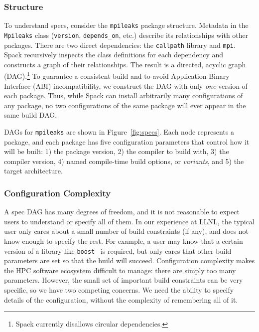 \subsubsection{Structure}
To understand specs, consider the {\tt mpileaks} package structure.
Metadata in the {\tt Mpileaks} class ({\tt version}, {\tt depends\_on}, etc.) describe
its relationships with other packages.  There are two direct dependencies:
the {\tt callpath} library and {\tt mpi}.  Spack recursively inspects the class definitions
for each dependency and constructs a graph of their relationships.  The result
is a directed, acyclic graph (DAG).\footnote{Spack currently disallows
circular dependencies.}
%
To guarantee a consistent build and to avoid 
Application Binary Interface (ABI) incompatibility, we construct
the DAG with only {\it one} version of each package.  Thus, while
Spack can install arbitrarily many configurations of any package,
no two configurations of the same package will ever appear in the same build DAG.

DAGs for {\tt mpileaks} are shown in Figure~\ref{fig:specs}.
Each node represents a package, and each package has five configuration parameters that control
how it will be built: 1) the package version, 2) the compiler to
build with, 3) the compiler version, 4) named compile-time build options, or {\it variants},
and 5) the target architecture.


\subsubsection{Configuration Complexity}
A spec DAG has many degrees of freedom, and it is not reasonable to expect users to
understand or specify all of them.  In our experience at LLNL, the typical user
only cares about a small number of build constraints (if any), and does not know enough to
specify the rest. For example, a user may know that a certain version of a library like
{\tt boost}~\cite{boost} is required, but only cares that other build parameters are set so that
the build will succeed.
%
Configuration complexity makes the HPC software ecosystem difficult to manage: there are
simply too many parameters. However, the small set of important build constraints can be
very specific, so we have two competing concerns.  We need the ability to specify details
of the configuration, without the complexity of remembering all of it.

